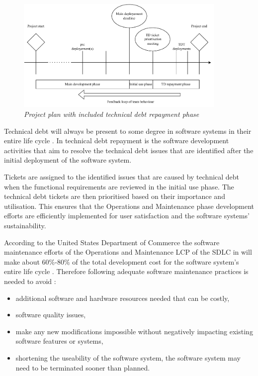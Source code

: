 \clearpage

\begin{figure}[!htb]
	\centering %
	\includegraphics[width=0.9\textwidth]{img/Chapter1/TD_repayment/TD_repayment.pdf}
	\caption[Project plan with included technical debt repayment phase]
	{\textit{Project plan with included technical debt repayment phase \cite{Wiese2021}}}\label{fig:ch1_tdRepayment}
\end{figure} 

Technical debt will always be present to some degree in software systems in their entire life cycle \cite{Wiese2021}. In  technical debt repayment is the software development activities that aim to resolve the technical debt issues that are identified after the initial deployment of the software system.\par Tickets are assigned to the identified issues that are caused by technical debt when the functional requirements are reviewed in the initial use phase. The technical debt tickets are then prioritised based on their importance and utilisation. This ensures that the Operations and Maintenance phase development efforts are efficiently implemented for user satisfaction and the software systems' sustainability. \par According to the United States Department of Commerce the software maintenance efforts of the Operations and Maintenance LCP of the SDLC in  will make about $60\%$-$80\%$ of the total development cost for the software system's entire life cycle \cite{Ogheneovo2014, Stark1996, Ackermann2009, Tang2010}. Therefore following adequate software maintenance practices is needed to avoid \cite{DeLeon-Sigg2020}:

\begin{itemize}
	\item additional software and hardware resources needed that can be costly,
	\item software quality issues,
	\item make any new modifications impossible without negatively impacting existing software features or systems,
	\item shortening the useability of the software system, the software system may need to be terminated sooner than planned.
\end{itemize}

